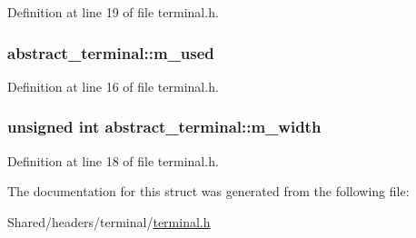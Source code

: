 Definition at line 19 of file terminal.h.

\hypertarget{structabstract__terminal_ab81c5c6dd91d663e1827deaa52aa3338}{
\subsubsection[{m\_\-used}]{ {\bf abstract\_\-terminal::m\_\-used}}}
\label{structabstract__terminal_ab81c5c6dd91d663e1827deaa52aa3338}


Definition at line 16 of file terminal.h.

\hypertarget{structabstract__terminal_a164ec0d15d6e0880f0874e060b3b189f}{
\subsubsection[{m\_\-width}]{\setlength{\rightskip}{0pt plus 5cm}unsigned int {\bf abstract\_\-terminal::m\_\-width}}}
\label{structabstract__terminal_a164ec0d15d6e0880f0874e060b3b189f}


Definition at line 18 of file terminal.h.



The documentation for this struct was generated from the following file:\begin{DoxyCompactItemize}
\item 
Shared/headers/terminal/\hyperlink{terminal_8h}{terminal.h}\end{DoxyCompactItemize}
